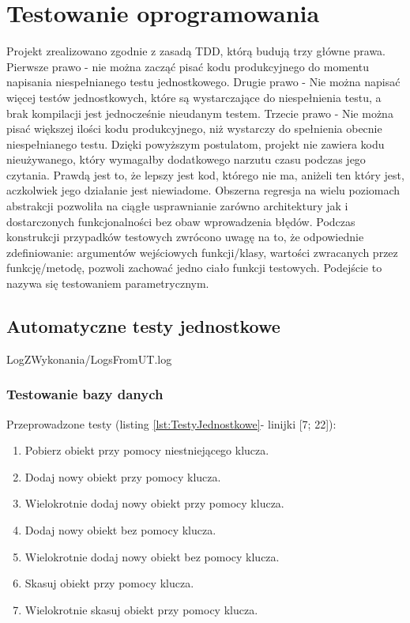 \chapter{Testowanie oprogramowania}
    Projekt zrealizowano zgodnie z zasadą TDD, którą budują trzy główne prawa.
    \newline
    Pierwsze prawo - nie można zacząć pisać kodu produkcyjnego do momentu napisania niespełnianego testu jednostkowego.
    \newline
    Drugie prawo - Nie można napisać więcej testów jednostkowych, które są wystarczające do niespełnienia testu, a brak kompilacji jest jednocześnie nieudanym testem.
    \newline
    Trzecie prawo - Nie można pisać większej ilości kodu produkcyjnego, niż wystarczy do spełnienia obecnie niespełnianego testu.\cite{martin2014czysty}
    \newline
    Dzięki powyższym postulatom, projekt nie zawiera kodu nieużywanego, który wymagałby dodatkowego narzutu czasu podczas jego czytania. Prawdą jest to, że lepszy jest kod,
    którego nie ma, aniżeli ten który jest, aczkolwiek jego działanie jest niewiadome. Obszerna regresja na wielu poziomach abstrakcji pozwoliła na ciągłe usprawnianie zarówno architektury
    jak i dostarczonych funkcjonalności bez obaw wprowadzenia błędów. Podczas konstrukcji przypadków testowych zwrócono uwagę na to, że odpowiednie zdefiniowanie: 
    argumentów wejściowych funkcji/klasy, wartości zwracanych przez funkcję/metodę, pozwoli zachować jedno ciało funkcji testowych. Podejście to nazywa się testowaniem parametrycznym.
    \section{Automatyczne testy jednostkowe}
        
        {LogZWykonania/LogsFromUT.log}
        \subsection{Testowanie bazy danych}
            Przeprowadzone testy (listing \ref{lst:TestyJednostkowe}- linijki [7; 22]):
            \begin{enumerate}
                \item Pobierz obiekt przy pomocy niestniejącego klucza.
                \item Dodaj nowy obiekt przy pomocy klucza.
                \item Wielokrotnie dodaj nowy obiekt przy pomocy klucza.
                \item Dodaj nowy obiekt bez pomocy klucza.
                \item Wielokrotnie dodaj nowy obiekt bez pomocy klucza.
                \item Skasuj obiekt przy pomocy klucza.
                \item Wielokrotnie skasuj obiekt przy pomocy klucza.
            \end{enumerate}
